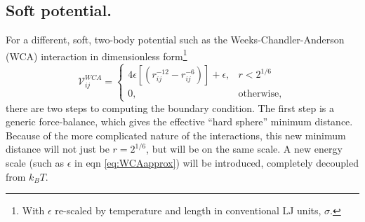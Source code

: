 \documentclass[twocolumn,amsmath,amssymb,aps]{revtex4-1}%
\begin{document}
\subsection{Soft potential.}
For a different, soft, two-body potential such as the Weeks-Chandler-Anderson
(WCA) interaction in dimensionless form\footnote{With $\epsilon$ re-scaled
  by temperature and length in conventional LJ units, $\sigma$.}
\begin{equation}\label{eq:WCAapprox}
  \mathcal{V}^{WCA}_{ij} =
  \begin{cases}
    4\epsilon[(r_{ij}^{-12}
      -r_{ij}^{-6})]+\epsilon,
    & r<2^{1/6} \\
    0, & \mathrm{otherwise},
  \end{cases}
\end{equation}
there are two steps to computing the boundary condition. The first step is a
generic force-balance, which gives the effective ``hard sphere'' minimum
distance. Because of the more complicated nature of the interactions, this new
minimum distance will not just be $r=2^{1/6}$, but will be on the same scale.
A new energy scale (such as $\epsilon$ in eqn \ref{eq:WCAapprox}) will
be introduced, completely decoupled from $k_BT$.
\end{document}
